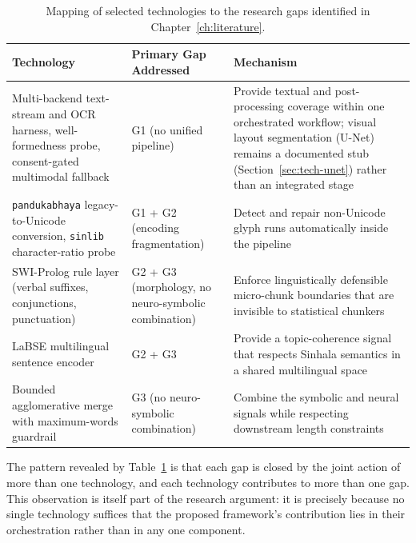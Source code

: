 \documentclass[12pt,a4paper,oneside]{report}
\begin{document}
\begin{table}[h]
\centering
\caption{Mapping of selected technologies to the research gaps identified in Chapter~\ref{ch:literature}.}
\label{tab:tech-gap-mapping}
\renewcommand{\arraystretch}{1.25}
\footnotesize
\begin{tabularx}{\textwidth}{p{4.5cm} p{2.6cm} X}
\hline
\textbf{Technology} & \textbf{Primary Gap Addressed} & \textbf{Mechanism} \\
\hline
Multi-backend text-stream and OCR harness, well-formedness probe, consent-gated multimodal fallback & G1 (no unified pipeline) & Provide textual and post-processing coverage within one orchestrated workflow; visual layout segmentation (U-Net) remains a documented stub (Section~\ref{sec:tech-unet}) rather than an integrated stage \\
\hline
\texttt{pandukabhaya} legacy-to-Unicode conversion, \texttt{sinlib} character-ratio probe & G1 + G2 (encoding fragmentation) & Detect and repair non-Unicode glyph runs automatically inside the pipeline \\
\hline
SWI-Prolog rule layer (verbal suffixes, conjunctions, punctuation) & G2 + G3 (morphology, no neuro-symbolic combination) & Enforce linguistically defensible micro-chunk boundaries that are invisible to statistical chunkers \\
\hline
LaBSE multilingual sentence encoder & G2 + G3 & Provide a topic-coherence signal that respects Sinhala semantics in a shared multilingual space \\
\hline
Bounded agglomerative merge with maximum-words guardrail & G3 (no neuro-symbolic combination) & Combine the symbolic and neural signals while respecting downstream length constraints \\
\hline
\end{tabularx}
\end{table}

The pattern revealed by Table~\ref{tab:tech-gap-mapping} is that each gap is closed by the joint action of more than one technology, and each technology contributes to more than one gap. This observation is itself part of the research argument: it is precisely because no single technology suffices that the proposed framework's contribution lies in their orchestration rather than in any one component.
\end{document}

